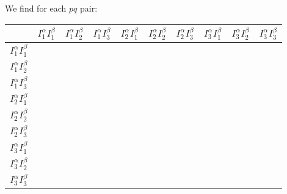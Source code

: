 We find for each $pq$ pair:
\begin{table}[H]
\begin{center}
\begin{tabular}{|l|l|l|l|l|l|l|l|l|l|}
\hline
 &   $I_{1}^{\alpha} I_{1}^{\beta}$ & $I_{1}^{\alpha} I_{2}^{\beta}$  &  $I_{1}^{\alpha} I_{3}^{\beta}$ &  $I_{2}^{\alpha} I_{1}^{\beta}$ & $I_{2}^{\alpha} I_{2}^{\beta}$  &  $I_{2}^{\alpha} I_{3}^{\beta}$ &  $I_{3}^{\alpha} I_{1}^{\beta}$ &  $I_{3}^{\alpha} I_{2}^{\beta}$ & $I_{3}^{\alpha} I_{3}^{\beta}$ \\ \hline \hline
 $I_{1}^{\alpha} I_{1}^{\beta}$ & \multicolumn{3}{l|}{\multirow{3}{*}{}} & \multicolumn{3}{l|}{\multirow{3}{*}{}} & \multicolumn{3}{l|}{\multirow{3}{*}{}} \\ \cline{1-1}
 $I_{1}^{\alpha} I_{2}^{\beta}$ & \multicolumn{3}{c|}{$\sigma^{\alpha pq}_{11} * \theta^{\beta pq}$}                  & \multicolumn{3}{c|}{$\sigma^{\alpha pq}_{12} * \theta^{\beta pq}$}                  & \multicolumn{3}{c|}{$\sigma^{\alpha pq}_{13} * \theta^{\beta pq}$}                \\ \cline{1-1}
 $I_{1}^{\alpha} I_{3}^{\beta}$ & \multicolumn{3}{l|}{}                  & \multicolumn{3}{l|}{}                  & \multicolumn{3}{l|}{}                  \\ \hline
 $I_{2}^{\alpha} I_{1}^{\beta}$ & \multicolumn{3}{l|}{\multirow{3}{*}{}} & \multicolumn{3}{l|}{\multirow{3}{*}{}} & \multicolumn{3}{l|}{\multirow{3}{*}{}} \\ \cline{1-1}
 $I_{2}^{\alpha} I_{2}^{\beta}$& \multicolumn{3}{c|}{$\sigma^{\alpha pq}_{21} * \theta^{\beta pq}$}                & \multicolumn{3}{c|}{$\sigma^{\alpha pq}_{22} * \theta^{\beta pq}$}                 & \multicolumn{3}{c|}{$\sigma^{\alpha pq}_{23} * \theta^{\beta pq}$}           \\ \cline{1-1}
 $I_{2}^{\alpha} I_{3}^{\beta}$ & \multicolumn{3}{l|}{}                  & \multicolumn{3}{l|}{}                  & \multicolumn{3}{l|}{}                  \\ \hline
 $I_{3}^{\alpha} I_{1}^{\beta}$ & \multicolumn{3}{l|}{\multirow{3}{*}{}} & \multicolumn{3}{l|}{\multirow{3}{*}{}} & \multicolumn{3}{l|}{\multirow{3}{*}{}} \\ \cline{1-1}
 $I_{3}^{\alpha} I_{2}^{\beta}$& \multicolumn{3}{c|}{$\sigma^{\alpha pq}_{31} * \theta^{\beta pq}$}                  & \multicolumn{3}{c|}{$\sigma^{\alpha pq}_{32} * \theta^{\beta pq}$}                 & \multicolumn{3}{c|}{$\sigma^{\alpha pq}_{33} * \theta^{\beta pq}$}               \\ \cline{1-1}
 $I_{3}^{\alpha} I_{3}^{\beta}$ & \multicolumn{3}{l|}{}                  & \multicolumn{3}{l|}{}                  & \multicolumn{3}{l|}{}                  \\ \hline
\end{tabular}
\end{center}
\end{table}

